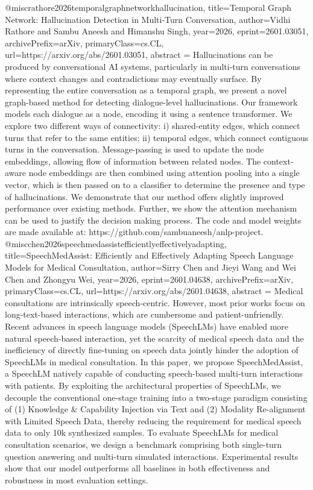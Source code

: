 {}@misc{rathore2026temporalgraphnetworkhallucination,
      title={Temporal Graph Network: Hallucination Detection in Multi-Turn Conversation}, 
      author={Vidhi Rathore and Sambu Aneesh and Himanshu Singh},
      year={2026},
      eprint={2601.03051},
      archivePrefix={arXiv},
      primaryClass={cs.CL},
      url={https://arxiv.org/abs/2601.03051},
      abstract = {Hallucinations can be produced by conversational AI systems, particularly in multi-turn conversations where context changes and contradictions may eventually surface. By representing the entire conversation as a temporal graph, we present a novel graph-based method for detecting dialogue-level hallucinations. Our framework models each dialogue as a node, encoding it using a sentence transformer. We explore two different ways of connectivity: i) shared-entity edges, which connect turns that refer to the same entities; ii) temporal edges, which connect contiguous turns in the conversation. Message-passing is used to update the node embeddings, allowing flow of information between related nodes. The context-aware node embeddings are then combined using attention pooling into a single vector, which is then passed on to a classifier to determine the presence and type of hallucinations. We demonstrate that our method offers slightly improved performance over existing methods. Further, we show the attention mechanism can be used to justify the decision making process. The code and model weights are made available at: https://github.com/sambuaneesh/anlp-project.}
}@misc{chen2026speechmedassistefficientlyeffectivelyadapting,
      title={SpeechMedAssist: Efficiently and Effectively Adapting Speech Language Models for Medical Consultation}, 
      author={Sirry Chen and Jieyi Wang and Wei Chen and Zhongyu Wei},
      year={2026},
      eprint={2601.04638},
      archivePrefix={arXiv},
      primaryClass={cs.CL},
      url={https://arxiv.org/abs/2601.04638},
      abstract = {Medical consultations are intrinsically speech-centric. However, most prior works focus on long-text-based interactions, which are cumbersome and patient-unfriendly. Recent advances in speech language models (SpeechLMs) have enabled more natural speech-based interaction, yet the scarcity of medical speech data and the inefficiency of directly fine-tuning on speech data jointly hinder the adoption of SpeechLMs in medical consultation. In this paper, we propose SpeechMedAssist, a SpeechLM natively capable of conducting speech-based multi-turn interactions with patients. By exploiting the architectural properties of SpeechLMs, we decouple the conventional one-stage training into a two-stage paradigm consisting of (1) Knowledge & Capability Injection via Text and (2) Modality Re-alignment with Limited Speech Data, thereby reducing the requirement for medical speech data to only 10k synthesized samples. To evaluate SpeechLMs for medical consultation scenarios, we design a benchmark comprising both single-turn question answering and multi-turn simulated interactions. Experimental results show that our model outperforms all baselines in both effectiveness and robustness in most evaluation settings.}
}
